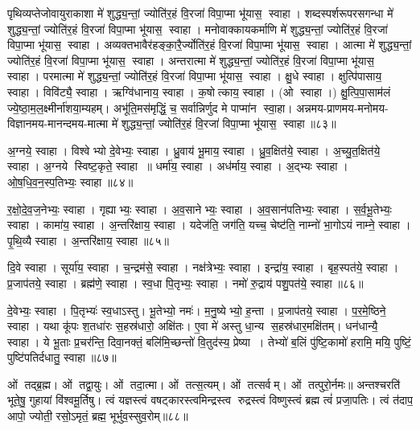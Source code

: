 पृथिव्यप्तेजोवायुराकाशा मे॑ शुद्ध्य॒न्तां॒ ज्योति॑र॒हं वि॒रजा॑ विपा॒प्मा भू॑यास॒ स्वाहा। 
शब्दस्पर्शरूपरसगन्धा  मे॑ शुद्ध्य॒न्तां॒ ज्योति॑र॒हं वि॒रजा॑ विपा॒प्मा भू॑यास॒ स्वाहा। 
मनोवाक्कायकर्माणि  मे॑ शुद्ध्य॒न्तां॒ ज्योति॑र॒हं वि॒रजा॑ विपा॒प्मा भू॑यास॒ स्वाहा। 
अव्यक्तभावैर॑हङ्का॒रै॒र्ज्योति॑र॒हं वि॒रजा॑ विपा॒प्मा भू॑यास॒ स्वाहा। 
आत्मा मे॑ शुद्ध्य॒न्तां॒ ज्योति॑र॒हं वि॒रजा॑ विपा॒प्मा भू॑यास॒ स्वाहा। 
अन्तरात्मा मे॑ शुद्ध्य॒न्तां॒ ज्योति॑र॒हं वि॒रजा॑ विपा॒प्मा भू॑यास॒ स्वाहा। 
परमात्मा  मे॑ शुद्ध्य॒न्तां॒ ज्योति॑र॒हं वि॒रजा॑ विपा॒प्मा भू॑यास॒ स्वाहा। 
क्षु॒धे स्वाहा। क्षुत्पि॑पासाय॒ स्वाहा। विवि॑ट्यै॒ स्वाहा। ऋग्वि॑धानाय॒ स्वाहा। क॒षोत्काय॒ स्वाहा। (ओ स्वाहा।) क्षु॒त्पि॒पा॒साम॑लं ज्ये॒ष्ठा॒म॒ल॒क्ष्मीर्ना॑शया॒म्यहम्। अभू॑ति॒मस॑मृद्धिं॒ च॒ सर्वान्निर्णुद मे पाप्मा॑न स्वा॒हा।
अन्नमय-प्राणमय-मनोमय-विज्ञानमय-मानन्दमय-मात्मा मे॑ शुद्ध्य॒न्तां॒ ज्योति॑र॒हं वि॒रजा॑ विपा॒प्मा भू॑यास॒ स्वाहा॥८३॥
\anuvakamend

अ॒ग्नये॒ स्वाहा। विश्वेभ्यो दे॒वेभ्यः॒ स्वाहा। ध्रु॒वाय॑ भू॒माय॒ स्वाहा। ध्रु॒व॒क्षित॑ये॒ स्वाहा। अ॒च्यु॒त॒क्षित॑ये॒ स्वाहा। अ॒ग्नये स्विष्ट॒कृते॒ स्वाहा ॥ धर्मा॑य॒ स्वाहा। अध॑र्माय॒ स्वाहा। अ॒द्भ्यः स्वाहा। ओ॒ष॒धि॒व॒न॒स्प॒तिभ्यः॒ स्वाहा॥८४॥ 

र॒क्षो॒दे॒व॒ज॒नेभ्यः॒ स्वाहा। गृह्याभ्यः॒ स्वाहा। अ॒व॒सानेभ्यः॒ स्वाहा। अ॒व॒सान॑पतिभ्यः॒ स्वाहा। स॒र्व॒भू॒तेभ्यः॒ स्वाहा। कामा॑य॒ स्वाहा। अ॒न्तरि॑क्षाय॒ स्वाहा। यदेज॑ति॒ जग॑ति॒ यच्च॒ चेष्ट॑ति॒ नाम्नो॑ भा॒गोऽयं नाम्ने॒ स्वाहा। पृ॒थि॒व्यै स्वाहा। अ॒न्तरि॑क्षाय॒ स्वाहा॥८५॥ 

दि॒वे स्वाहा। सूर्या॑य॒ स्वाहा। च॒न्द्रम॑से॒ स्वाहा। नक्ष॑त्रेभ्यः॒ स्वाहा। इन्द्रा॑य॒ स्वाहा। बृह॒स्पत॑ये॒ स्वाहा। प्र॒जाप॑तये॒ स्वाहा। ब्रह्म॑णे॒ स्वाहा। स्व॒धा पि॒तृभ्यः॒ स्वाहा। नमो॑ रु॒द्राय॑ पशु॒पत॑ये॒ स्वाहा॥८६॥

  दे॒वेभ्यः॒ स्वाहा। पि॒तृभ्यः॑ स्व॒धाऽस्तु। भू॒तेभ्यो॒ नमः॑। म॒नु॒ष्येभ्यो॒ ह॒न्ता। प्र॒जाप॑तये॒ स्वाहा। प॒र॒मे॒ष्ठिने॒ स्वाहा। यथा कू॑पः श॒तधा॑रः स॒हस्र॑धारो॒ अक्षि॑तः। ए॒वा मे॑ अस्तु धा॒न्य स॒हस्र॑धार॒मक्षि॑तम्। धन॑धान्यै॒ स्वाहा। ये भू॒ताः प्र॒चर॑न्ति॒ दिवा॒नक्तं॒ बलि॑मि॒च्छन्तो॑ वि॒तुद॑स्य॒ प्रेष्या। तेभ्यो॑ ब॒लिं पु॑ष्टि॒कामो॑ हरामि॒ मयि॒ पुष्टिं॒ पुष्टि॑पतिर्दधातु॒ स्वाहा॥८७॥ \anuvakamend

ओं तद्ब्र॒ह्म। ओं तद्वा॒युः। ओं तदा॒त्मा। ओं तत्स॒त्यम्‌।
ओं तत्सर्वम्‌। ओं तत्पुरो॒र्नमः॥
अन्तश्चरति॑ भूते॒षु॒ गुहायां वि॑श्वमू॒र्तिषु। 
त्वं यज्ञस्त्वं वषट्कारस्त्वमिन्द्रस्त्व रुद्रस्त्वं विष्णुस्त्वं ब्रह्म त्वं॑ प्रजा॒पतिः।
त्वं त॑दाप॒ आपो॒ ज्योती॒ रसो॒ऽमृतं॒ ब्रह्म॒ भूर्भुव॒स्सुव॒रोम्‌॥८८॥
\anuvakamend

